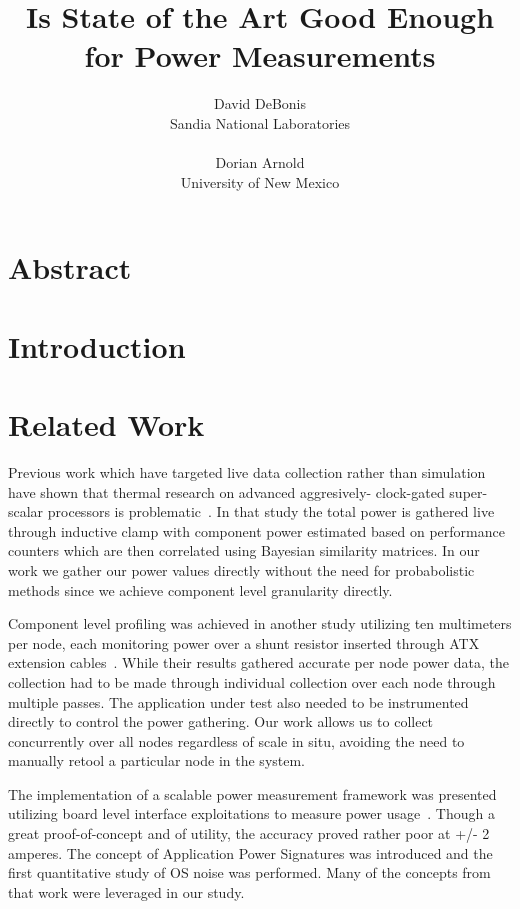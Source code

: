 \documentclass{article}
\begin{document}
\title{Is State of the Art Good Enough\\for Power Measurements}
\author{David DeBonis\\Sandia National Laboratories\\\\
Dorian Arnold\\University of New Mexico}
\renewcommand{\today}{July 22, 2013}
\maketitle
\section{Abstract}
\section{Introduction}
\section{Related Work}
Previous work which have targeted live data collection rather than
simulation have shown that thermal research on advanced aggresively-
clock-gated super-scalar processors is problematic~\cite{isci2003}.  In
that study the total power is gathered live through inductive clamp
with component power estimated based on performance counters which
are then correlated using Bayesian similarity matrices.  In our
work we gather our power values directly without the need for
probabolistic methods since we achieve component level granularity
directly.

Component level profiling was achieved in another study utilizing
ten multimeters per node, each monitoring power over a shunt resistor
inserted through ATX extension cables~\cite{feng2005}.  While their results
gathered accurate per node power data, the collection had to be made
through individual collection over each node through multiple passes.
The application under test also needed to be instrumented directly to
control the power gathering.  Our work allows us to collect concurrently
over all nodes regardless of scale in situ, avoiding the need to
manually retool a particular node in the system.

The implementation of a scalable power measurement framework was
presented utilizing board level interface exploitations to measure
power usage~\cite{laros2009}.  Though a great proof-of-concept and of
utility, the accuracy proved rather poor at +/- 2 amperes.  The
concept of Application Power Signatures was introduced and the
first quantitative study of OS noise was performed.  Many of the
concepts from that work were leveraged in our study.
\end{document}
